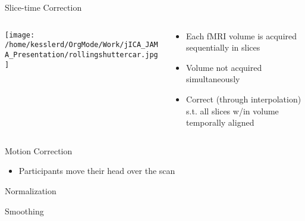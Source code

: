 \documentclass[presentation]{beamer}
\begin{document}
\begin{frame}[label={sec:orgheadline9}]{Slice-time Correction}
\begin{columns}
\begin{column}{.2\columnwidth}
\texttt{[image: /home/kesslerd/OrgMode/Work/jICA\_JAMA\_Presentation/rollingshuttercar.jpg]}
\end{column}
\begin{column}{.5\columnwidth}
\begin{itemize}
\item Each fMRI volume is acquired sequentially in slices
\item Volume not acquired simultaneously
\item Correct (through interpolation) s.t. all slices w/in volume temporally aligned
\end{itemize}
\end{column}
\end{columns}
\end{frame}
\begin{frame}[label={sec:orgheadline10}]{Motion Correction}
\begin{itemize}
\item Participants move their head over the scan
\end{itemize}
\end{frame}
\begin{frame}[label={sec:orgheadline11}]{Normalization}
\end{frame}
\begin{frame}[label={sec:orgheadline12}]{Smoothing}
\end{frame}
\end{document}
